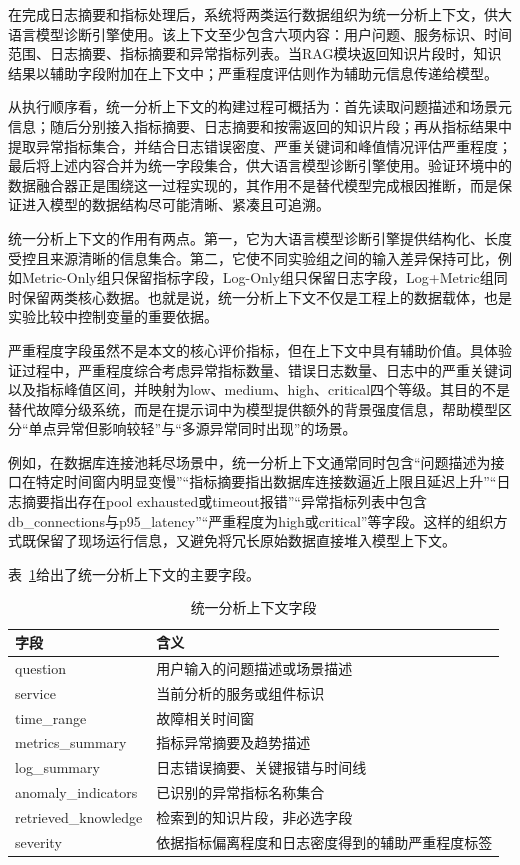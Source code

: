 在完成日志摘要和指标处理后，系统将两类运行数据组织为统一分析上下文，供大语言模型诊断引擎使用。该上下文至少包含六项内容：用户问题、服务标识、时间范围、日志摘要、指标摘要和异常指标列表。当RAG模块返回知识片段时，知识结果以辅助字段附加在上下文中；严重程度评估则作为辅助元信息传递给模型。

从执行顺序看，统一分析上下文的构建过程可概括为：首先读取问题描述和场景元信息；随后分别接入指标摘要、日志摘要和按需返回的知识片段；再从指标结果中提取异常指标集合，并结合日志错误密度、严重关键词和峰值情况评估严重程度；最后将上述内容合并为统一字段集合，供大语言模型诊断引擎使用。验证环境中的数据融合器正是围绕这一过程实现的，其作用不是替代模型完成根因推断，而是保证进入模型的数据结构尽可能清晰、紧凑且可追溯。

统一分析上下文的作用有两点。第一，它为大语言模型诊断引擎提供结构化、长度受控且来源清晰的信息集合。第二，它使不同实验组之间的输入差异保持可比，例如Metric-Only组只保留指标字段，Log-Only组只保留日志字段，Log+Metric组同时保留两类核心数据。也就是说，统一分析上下文不仅是工程上的数据载体，也是实验比较中控制变量的重要依据。

严重程度字段虽然不是本文的核心评价指标，但在上下文中具有辅助价值。具体验证过程中，严重程度综合考虑异常指标数量、错误日志数量、日志中的严重关键词以及指标峰值区间，并映射为low、medium、high、critical四个等级。其目的不是替代故障分级系统，而是在提示词中为模型提供额外的背景强度信息，帮助模型区分“单点异常但影响较轻”与“多源异常同时出现”的场景。

例如，在数据库连接池耗尽场景中，统一分析上下文通常同时包含“问题描述为接口在特定时间窗内明显变慢”“指标摘要指出数据库连接数逼近上限且延迟上升”“日志摘要指出存在pool exhausted或timeout报错”“异常指标列表中包含db\_connections与p95\_latency”“严重程度为high或critical”等字段。这样的组织方式既保留了现场运行信息，又避免将冗长原始数据直接堆入模型上下文。

表~\ref{tab:analysis-context}给出了统一分析上下文的主要字段。

\begin{table}[htbp]
\centering
\caption{统一分析上下文字段}
\label{tab:analysis-context}
\small
\setlength{\tabcolsep}{4pt}
\renewcommand{\arraystretch}{1.12}
\begin{tabular}{p{2.9cm}p{8.1cm}}
\toprule
字段 & 含义 \\
\midrule
question & 用户输入的问题描述或场景描述 \\
service & 当前分析的服务或组件标识 \\
time\_range & 故障相关时间窗 \\
metrics\_summary & 指标异常摘要及趋势描述 \\
log\_summary & 日志错误摘要、关键报错与时间线 \\
anomaly\_indicators & 已识别的异常指标名称集合 \\
retrieved\_knowledge & 检索到的知识片段，非必选字段 \\
severity & 依据指标偏离程度和日志密度得到的辅助严重程度标签 \\
\bottomrule
\end{tabular}
\end{table}

